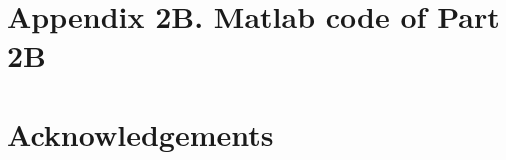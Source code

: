 \documentclass{article}
\begin{document}

\section{Appendix 2B. Matlab code of Part 2B}


\section{Acknowledgements}
\end{document}
